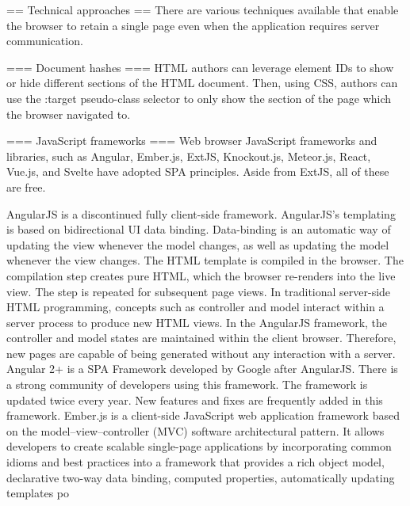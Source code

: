 \documentclass[12pt,a4paper]{report}
\begin{document}
== Technical approaches ==
There are various techniques available that enable the browser to retain a single page even when the application requires server communication.


=== Document hashes ===
HTML authors can leverage element IDs to show or hide different sections of the HTML document.  Then, using CSS, authors can use the :target pseudo-class selector to only show the section of the page which the browser navigated to.


=== JavaScript frameworks ===
Web browser JavaScript frameworks and libraries, such as Angular, Ember.js, ExtJS, Knockout.js, Meteor.js, React, Vue.js, and Svelte have adopted SPA principles. Aside from ExtJS, all of these are free. 

AngularJS is a discontinued fully client-side framework. AngularJS's templating is based on bidirectional UI data binding. Data-binding is an automatic way of updating the view whenever the model changes, as well as updating the model whenever the view changes. The HTML template is compiled in the browser. The compilation step creates pure HTML, which the browser re-renders into the live view. The step is repeated for subsequent page views. In traditional server-side HTML programming, concepts such as controller and model interact within a server process to produce new HTML views. In the AngularJS framework, the controller and model states are maintained within the client browser. Therefore, new pages are capable of being generated without any interaction with a server.
Angular 2+ is a SPA Framework developed by Google after AngularJS. There is a strong community of developers using this framework. The framework is updated twice every year. New features and fixes are frequently added in this framework.
Ember.js is a client-side JavaScript web application framework based on the model–view–controller (MVC) software architectural pattern. It allows developers to create scalable single-page applications by incorporating common idioms and best practices into a framework that provides a rich object model, declarative two-way data binding, computed properties, automatically updating templates po
\end{document}
